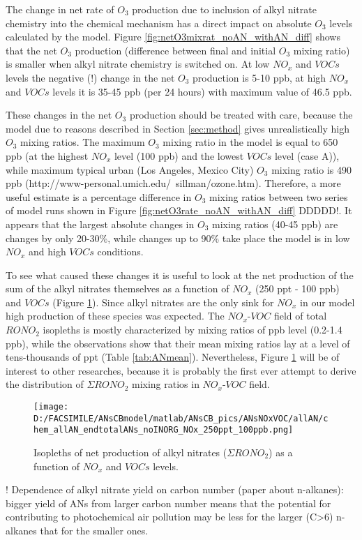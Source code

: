 \documentclass[11pt,a4paper]{article}
\begin{document}
The change in net rate of $O_3$ production due to inclusion of alkyl nitrate chemistry into the chemical mechanism has a direct impact on absolute $O_3$ levels calculated by the model. Figure \ref{fig:netO3mixrat_noAN_withAN_diff} shows that the net $O_3$ production (difference between final and initial $O_3$ mixing ratio) is smaller when alkyl nitrate chemistry is switched on. At low $NO_x$ and $VOCs$ levels the negative (!) change in the net $O_3$ production is 5-10 ppb, at high $NO_x$ and $VOCs$ levels it is 35-45 ppb (per 24 hours) with maximum value of 46.5 ppb.

These changes in the net $O_3$ production should be treated with care, because the model due to reasons described in Section \ref{sec:method} gives unrealistically high $O_3$ mixing ratios. The maximum $O_3$ mixing ratio in the model is equal to 650 ppb (at the highest $NO_x$ level (100 ppb) and the lowest $VOCs$ level (case A)), while maximum typical urban (Los Angeles, Mexico City) $O_3$ mixing ratio is 490 ppb (http://www-personal.umich.edu/~sillman/ozone.htm). Therefore, a more useful estimate is a percentage difference in $O_3$ mixing ratios between two series of model runs shown in Figure \ref{fig:netO3rate_noAN_withAN_diff} DDDDD!. It appears that the largest absolute changes in $O_3$ mixing ratios (40-45 ppb) are changes by only 20-30\%, while changes up to 90\% take place the model is in low $NO_x$ and high $VOCs$ conditions.

To see what caused these changes it is useful to look at the net production of the sum of the alkyl nitrates themselves as a function of $NO_x$ (250 ppt - 100 ppb) and $VOCs$ (Figure \ref{fig:endtotalANs}). Since alkyl nitrates are the only sink for $NO_x$ in our model high production of these species was expected. The $NO_x$-$VOC$ field of total $RONO_2$ isopleths is mostly characterized by mixing ratios of ppb level (0.2-1.4 ppb), while the observations show that their mean mixing ratios lay at a level of tens-thousands of ppt (Table \ref{tab:ANmean}). Nevertheless, Figure \ref{fig:endtotalANs} will be of interest to other researches, because it is probably the first ever attempt to derive the distribution of $\Sigma RONO_2$ mixing ratios in $NO_x$-$VOC$ field.

\begin{figure} %
\texttt{[image: D:/FACSIMILE/ANsCBmodel/matlab/ANsCB\_pics/ANsNOxVOC/allAN/chem\_allAN\_endtotalANs\_noINORG\_NOx\_250ppt\_100ppb.png]}
\caption{Isopleths of net production of alkyl nitrates ($\Sigma RONO_2$) as a function of $NO_x$ and $VOCs$ levels.}\label{fig:endtotalANs}
\end{figure}
! Dependence of alkyl nitrate yield on carbon number (paper about n-alkanes): bigger yield of ANs from larger carbon number means that the potential for contributing to photochemical air pollution may be less for the larger (C>6) n-alkanes that for the smaller ones.
\end{document}
